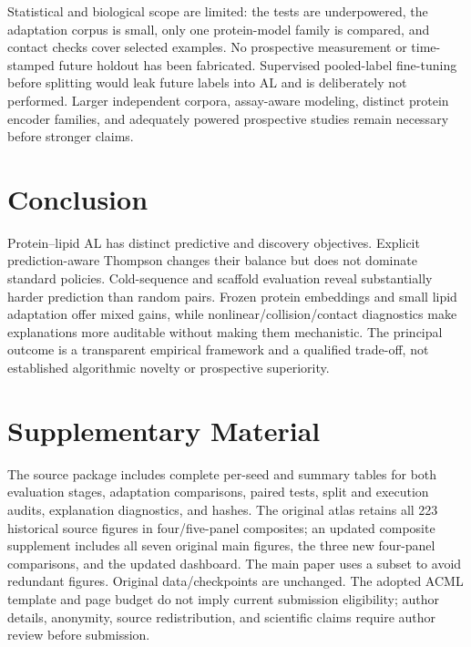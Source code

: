 \documentclass[wcp]{jmlr}
\begin{document}
Statistical and biological scope are limited: the tests are underpowered,
the adaptation corpus is small, only one protein-model family is compared,
and contact checks cover selected examples. No prospective measurement or
time-stamped future holdout has been fabricated. Supervised pooled-label
fine-tuning before splitting would leak future labels into AL and is
deliberately not performed. Larger independent corpora, assay-aware modeling,
distinct protein encoder families, and adequately powered prospective studies
remain necessary before stronger claims.

\section{Conclusion}
Protein--lipid AL has distinct predictive and discovery objectives. Explicit
prediction-aware Thompson changes their balance but does not dominate
standard policies. Cold-sequence and scaffold evaluation reveal substantially
harder prediction than random pairs. Frozen protein embeddings and small
lipid adaptation offer mixed gains, while nonlinear/collision/contact
diagnostics make explanations more auditable without making them mechanistic.
The principal outcome is a transparent empirical framework and a qualified
trade-off, not established algorithmic novelty or prospective superiority.

\section*{Supplementary Material}
The source package includes complete per-seed and summary tables for both
evaluation stages, adaptation comparisons, paired tests, split and execution
audits, explanation diagnostics, and hashes. The original atlas retains all
223 historical source figures in four/five-panel composites; an updated
composite supplement includes all seven original main figures, the three new
four-panel comparisons, and the updated dashboard. The main paper uses a
subset to avoid redundant figures. Original data/checkpoints are unchanged.
The adopted ACML template and page budget do not imply current submission
eligibility; author details, anonymity, source redistribution, and scientific
claims require author review before submission.
\end{document}
